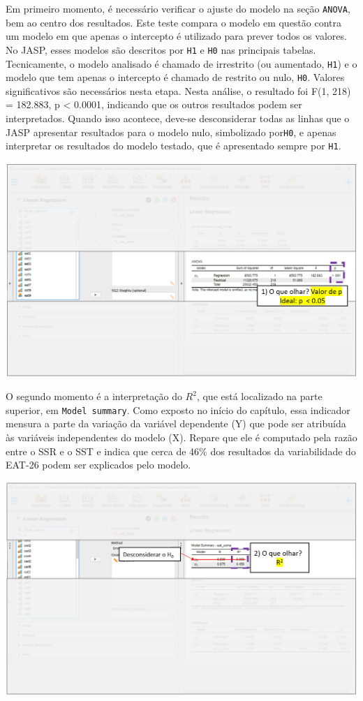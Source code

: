 \documentclass[
]{book}
\begin{document}
Em primeiro momento, é necessário verificar o ajuste do modelo na seção \texttt{ANOVA}, bem ao centro dos resultados. Este teste compara o modelo em questão contra um modelo em que apenas o intercepto é utilizado para prever todos os valores. No JASP, esses modelos são descritos por \texttt{H1} e \texttt{H0} nas principais tabelas. Tecnicamente, o modelo analisado é chamado de irrestrito (ou aumentado, \texttt{H1}) e o modelo que tem apenas o intercepto é chamado de restrito ou nulo, \texttt{H0}. Valores significativos são necessários nesta etapa. Nesta análise, o resultado foi F(1, 218) = 182.883, p \textless{} 0.0001, indicando que os outros resultados podem ser interpretados. Quando isso acontece, deve-se desconsiderar todas as linhas que o JASP apresentar resultados para o modelo nulo, simbolizado por\texttt{H0}, e apenas interpretar os resultados do modelo testado, que é apresentado sempre por \texttt{H1}.

\includegraphics{./img/cap_reg_resultados1.png}

O segundo momento é a interpretação do \(R^2\), que está localizado na parte superior, em \texttt{Model\ summary}. Como exposto no início do capítulo, essa indicador mensura a parte da variação da variável dependente (Y) que pode ser atribuída às variáveis independentes do modelo (X). Repare que ele é computado pela razão entre o SSR e o SST e indica que cerca de 46\% dos resultados da variabilidade do EAT-26 podem ser explicados pelo modelo.

\includegraphics{./img/cap_reg_resultados2.png}
\end{document}
